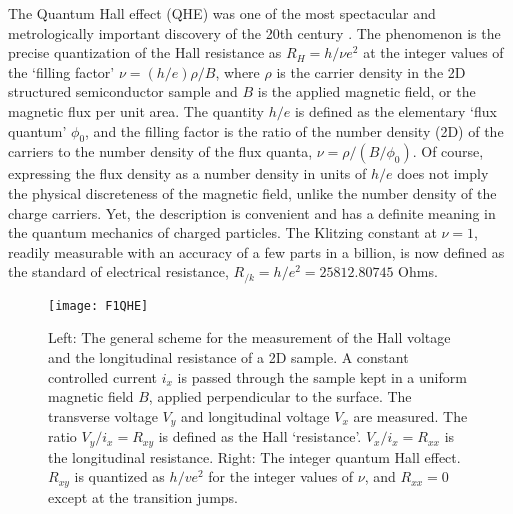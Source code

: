 \documentclass[aps,preprint,12pt,tightenlines]{revtex4}%
\begin{document}
The Quantum Hall effect (QHE) was one of the most spectacular and
metrologically important discovery of the 20th century \cite{Klitzing-PRL}.
The phenomenon is the precise quantization of the Hall resistance as
$R_{H}=h/\nu e^{2}$ at the integer values of the `filling factor' $\nu=\left(
h/e\right)  \rho/B$, where $\rho$ is the carrier density in the 2D structured
semiconductor sample and $B$ is the applied magnetic field, or the magnetic
flux per unit area. The quantity $h/e$ is defined as the elementary `flux
quantum' $\phi_{0}$, and the filling factor is the ratio of the number density
(2D) of the carriers to the number density of the flux quanta, $\nu
=\rho/\left(  B/\phi_{0}\right)  $. Of course, expressing the flux density as
a number density in units of $h/e$ does not imply the physical discreteness of
the magnetic field, unlike the number density of the charge carriers. Yet, the
description is convenient and has a definite meaning in the quantum mechanics
of charged particles. The Klitzing constant at $\nu=1$, readily measurable
with an accuracy of a few parts in a billion, is now defined as the standard
of electrical resistance, $R_{/k}=h/e^{2}=25812.80745$ Ohms.
\begin{figure}
	\centering
	\texttt{[image: F1QHE]}
	\caption{Left: The general scheme for the measurement of the Hall voltage and
			the longitudinal resistance of a 2D sample. A constant controlled current
			$i_{x}$ is passed through the sample kept in a uniform magnetic field $B$,
			applied perpendicular to the surface. The transverse voltage $V_{y}$ and
			longitudinal voltage $V_{x}$ are measured. The ratio $V_{y}/i_{x}=R_{xy}$ is
			defined as the Hall `resistance'. $V_{x}/i_{x}=R_{xx}$ is the longitudinal
			resistance. Right: The integer quantum Hall effect. $R_{xy}$ is quantized as
			$h/ve^{2}$ for the integer values of $\nu$, and $R_{xx}=0$ except at the
			transition jumps.}
	\label{fig:qhe}
\end{figure}
\end{document}
